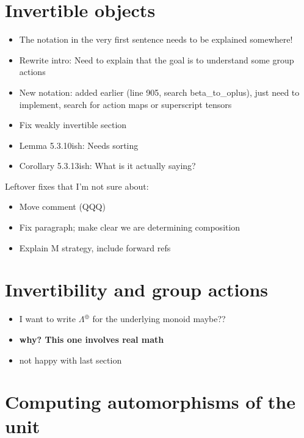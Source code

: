 \documentclass{amsart}
\begin{document}
\section{Invertible objects}

\begin{itemize}
\item The notation in the very first sentence needs to be explained somewhere!
\item Rewrite intro: Need to explain that the goal is to understand some group actions
\item New notation: added earlier (line 905, search beta\_to\_oplus), just need to implement, search for action maps or superscript tensors
\item Fix weakly invertible section
\item Lemma 5.3.10ish: Needs sorting
\item Corollary 5.3.13ish: What is it actually saying?
\end{itemize}

Leftover fixes that I'm not sure about:
\begin{itemize}
\item Move comment (QQQ)
\item Fix paragraph; make clear we are determining composition
\item Explain M strategy, include forward refs
\end{itemize}



\section{Invertibility and group actions}

\begin{itemize}
\item I want to write $\Lambda^{\oplus}$ for the underlying monoid maybe??
\item \textbf{why? This one involves real math}
\item not happy with last section
\end{itemize}



\section{Computing automorphisms of the unit}
\end{document}
